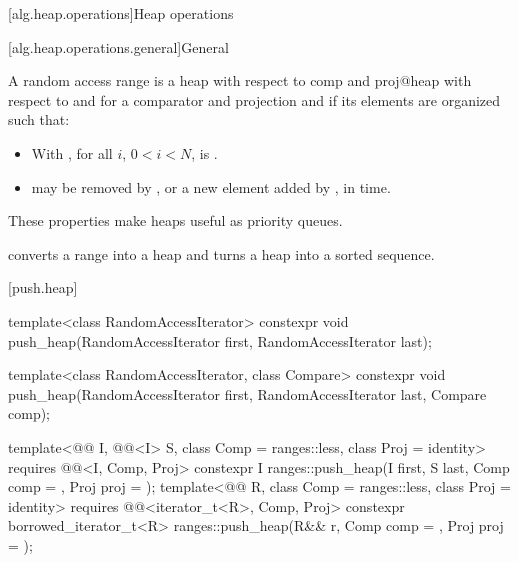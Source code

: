 [alg.heap.operations]{Heap operations}

[alg.heap.operations.general]{General}

\pnum
A random access range  is a
{heap with respect to comp and proj@heap with respect to  and }
for a comparator and projection  and 
if its elements are organized such that:
\begin{itemize}
\item
  With , for all $i$, $0 < i < N$,
  is .
\item
   may be removed by , or
  a new element added by ,
  in  time.
\end{itemize}

\pnum
These properties make heaps useful as priority queues.

\pnum
{} converts a range into a heap and
 turns a heap into a sorted sequence.

[push.heap]{}

%
\begin{itemdecl}
template<class RandomAccessIterator>
  constexpr void push_heap(RandomAccessIterator first, RandomAccessIterator last);

template<class RandomAccessIterator, class Compare>
  constexpr void push_heap(RandomAccessIterator first, RandomAccessIterator last,
                           Compare comp);

template<@@ I, @@<I> S, class Comp = ranges::less,
         class Proj = identity>
  requires @@<I, Comp, Proj>
  constexpr I
    ranges::push_heap(I first, S last, Comp comp = {}, Proj proj = {});
template<@@ R, class Comp = ranges::less, class Proj = identity>
  requires @@<iterator_t<R>, Comp, Proj>
  constexpr borrowed_iterator_t<R>
    ranges::push_heap(R&& r, Comp comp = {}, Proj proj = {});
\end{itemdecl}

